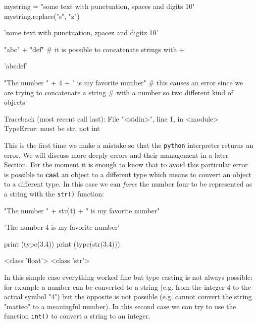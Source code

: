\begin{ipythonnon}
mystring = "some text with punctuation, spaces and digits 10" 
mystring.replace("s", "z")
\end{ipythonnon}
\begin{ioutput}
'zome text with punctuation, zpacez and digitz 10'
\end{ioutput}

\begin{ipythonnon}
"abc" + "def" # it is possible to concatenate strings with + 
\end{ipythonnon}
\begin{ioutput}
'abcdef'
\end{ioutput}

\begin{ipythonnon}
"The number " + 4 + " is my favorite number"
# this causes an error since we are trying to concatenate a string
# with a number so two different kind of objects
\end{ipythonnon}
\begin{ioutput} 
Traceback (most recent call last):
  File "<stdin>", line 1, in <module>
TypeError: must be str, not int
\end{ioutput}

This is the first time we make a mistake so that the \texttt{python} interpreter returns an error. We will discuss more deeply errors and their management in a later Section. 
For the moment it is enough to know that to avoid this particular error is possible to \textbf{cast} an object to a different type which means to convert an object to a different type. In this case we can \emph{force} the number four to be represented as a string with the \texttt{str()} function:

\begin{ipythonnon}
"The number " + str(4) + " is my favorite number"
\end{ipythonnon}
\begin{ioutput}
'The number 4 is my favorite number'
\end{ioutput}

\begin{ipythonnon}
print (type(3.4)) 
print (type(str(3.4)))
\end{ipythonnon}
\begin{ioutput}
<class 'float'>
<class 'str'>	
\end{ioutput}

In this simple case everything worked fine but type casting is not always possible: for example a number can be converted to a string (e.g. from the integer 4 to the actual symbol "4") but the opposite is not possible (e.g. cannot convert the string "matteo" to a meaningful number). In this second case we can try to use the function \texttt{int()} to convert a string to an integer.

